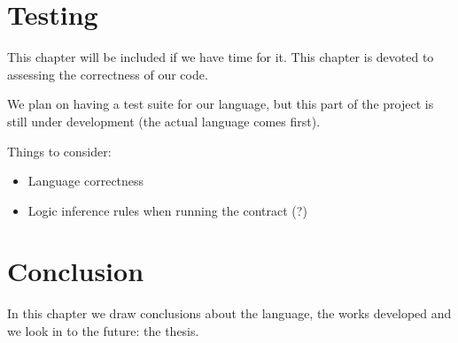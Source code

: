 \documentclass{ituthesis}
\begin{document}
\chapter{Testing}
This chapter will be included if we have time for it.
This chapter is devoted to assessing the correctness of our code.\par
We plan on having a test suite for our language, but this part of the project is still under development (the actual language comes first).\par
Things to consider:
\begin{itemize}
    \item Language correctness
    \item Logic inference rules when running the contract (?)
\end{itemize}


\chapter{Conclusion}
In this chapter we draw conclusions about the language, the works developed and we look in to the future: the thesis.




\end{document}
